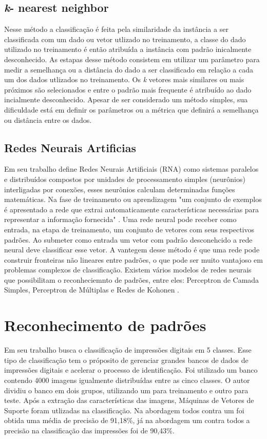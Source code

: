 \subsection{\textit{k}- nearest neighbor}
Nesse método a classificação é feita pela similaridade da instância a ser classificada com um dado ou vetor utlizado no treinamento, a classe do dado utilizado no treinamento é então atribuída a instância com padrão inicalmente desconhecido. As estapas desse método consistem em utilizar um parâmetro para medir a semelhança ou a distância do dado a ser classificado em relação a cada um dos dados utlizados no treinamento. Os \textit{k} vetores mais similares ou mais próximos são selecionados e entre o padrão mais frequente é atribuído ao dado incialmente desconhecido. Apesar de ser considerado um método simples, sua dificuldade está em definir os parâmetros ou a métrica que definirá a semelhança ou distância entre os dados\cite{Chagas09KNN}.

\subsection{Redes Neurais Artificias}
Em seu trabalho   define Redes Neurais Artificiais (RNA) como sistemas paralelos e distribuídos compostos por unidades de processamento simples (neurônios) interligadas por conexões, esses neurônios calculam determinadas funções matemáticas. Na fase de treinamento ou aprendizagem "um conjunto de exemplos é apresentado a rede que extrai automaticamente características necessárias para representar a informação fornecida" \cite{Morais2010RNA}.
Uma rede neural pode receber como entrada, na etapa de treinamento, um conjunto de vetores com seus respectivos padrões. Ao submeter como entrada um vetor com padrão desconehcido a rede neural deve classificar esse vetor. A vantegem desse método é que uma rede pode construir fronteiras não lineares entre padrões, o que pode ser muito vantajoso em problemas complexos de classificação. Existem vários modelos de redes neurais que possibilitam o reconheciemnto de padrões, entre eles: Perceptron de Camada Simples, Perceptron de Múltiplas e Redes de Kohonen \cite{ZubenRNA2}.

\section{Reconhecimento de padrões}
Em seu trabalho  busca o classificação de impressões digitais em 5 classes. Esse tipo de classificação tem o próposito de gerenciar grandes bancos de dados de impressões digitais e acelerar o processo de identificação. Foi utilizado um banco contendo 4000 imagens igualmente distribuídas entre as cinco classes. O autor dividiu o banco em dois grupos, utilizando um para treinamento e outro para teste. Após a extração das características das imagens, Máquinas de Vetores de Suporte foram utlizadas na classificação. Na abordagem todos contra um foi obtida uma média de precisão de 91,18\%, já na abordagem um contra todos a precisão na classificação das impressões foi de 90,43\%.

